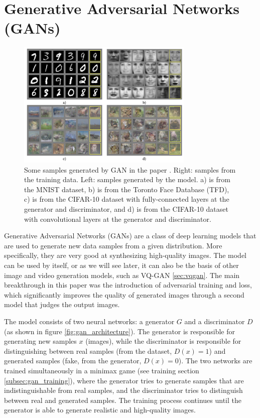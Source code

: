 \section{Generative Adversarial Networks (GANs)}
\label{sec:gan}

\begin{figure}
    \centering
    \includegraphics[width=0.75\textwidth]{images/gan/gan_samples.png}
    \caption{Some samples generated by GAN in the paper \cite{gan}. Right: samples from the training data. Left: samples generated by the model. a) is from the MNIST dataset, b) is from the Toronto Face Database (TFD), c) is from the CIFAR-10 dataset with fully-connected layers at the generator and discriminator, and d) is from the CIFAR-10 dataset with convolutional layers at the generator and discriminator.}
\end{figure}

Generative Adversarial Networks (GANs) \cite{gan} are a class of deep learning models that are used to generate new data samples from a given distribution. More specifically, they are very good at synthesizing high-quality images. The model can be used by itself, or as we will see later, it can also be the basis of other image and video generation models, such as VQ-GAN \ref{sec:vqgan}. The main breakthrough in this paper was the introduction of adversarial training and loss, which significantly improves the quality of generated images through a second model that judges the output images.



The model consists of two neural networks: a generator $G$ and a discriminator $D$ (as shown in figure \ref{fig:gan_architecture}). The generator is responsible for generating new samples $x$ (images), while the discriminator is responsible for distinguishing between real samples (from the dataset, $D(x) = 1$) and generated samples (fake, from the generator, $D(x) = 0$). The two networks are trained simultaneously in a minimax game (see training section \ref{subsec:gan_training}), where the generator tries to generate samples that are indistinguishable from real samples, and the discriminator tries to distinguish between real and generated samples. The training process continues until the generator is able to generate realistic and high-quality images. 

